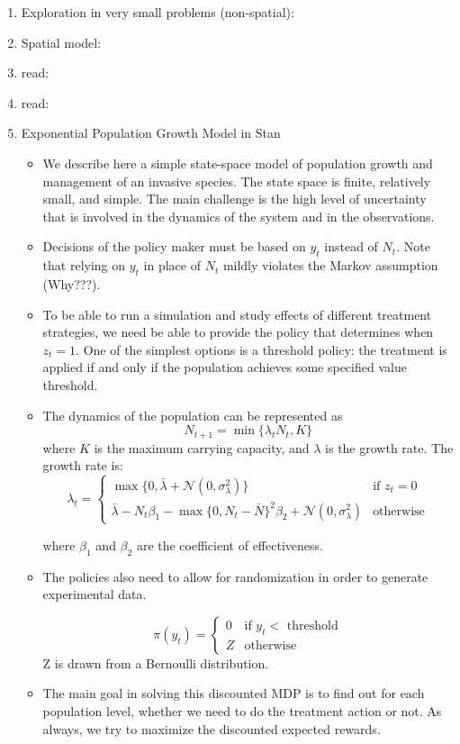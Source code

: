 \documentclass{article}
\theoremstyle{remark}
\theoremstyle{remark}
\theoremstyle{remark}
\theoremstyle{remark}
\theoremstyle{remark}
\theoremstyle{remark}
\newcommand{\marek}[1]{\textcolor{Bittersweet}{#1}}
\begin{document}
\begin{enumerate}
\begin{itemize}
	\end{itemize}
	\item Exploration in very small problems (non-spatial): \cite{Hall2018,Taleghan2015}
	\item Spatial model: \cite{Nicol2017}
	\item \marek{read}: \cite{Albers2018}
	\item \marek{read}: \cite{Mehta2007}
	\item Exponential Population Growth Model in Stan
	\begin{itemize}
		\item We describe here a simple state-space model of population growth and management of an invasive species. The state space is finite, relatively small, and simple. The main challenge is the high level of uncertainty that is involved in the dynamics of the system and in the observations.
		\item Decisions of the policy maker must be based on $y_t$ instead of $N_t$. Note that relying on $y_t$ in place of $N_t$ mildly violates the Markov assumption (Why???).
		\item To be able to run a simulation and study effects of different treatment strategies, we need be able to provide the policy that determines when $z_t=1$. One of the simplest options is a threshold policy: the treatment is applied if and only if the population achieves some specified value threshold.
		\item The dynamics of the population can be represented as
		$$ N_{t+1} = \min \{\lambda_t N_t, K \} $$
		where $K$ is the maximum carrying capacity, and $\lambda$ is the growth rate. The growth rate is:
		\begin{equation}
		\lambda_t = \begin{cases}
				\max \{ 0, \bar{\lambda} + \mathcal{N}(0, \sigma_\lambda^2) \} & \text{if $z_t = 0 $} \\
				\bar{\lambda} - N_t \beta_1 - \max \{ 0, N_t - \bar{N}\}^2\beta_2 + \mathcal{N}(0, \sigma_\lambda^2) & \text{otherwise}
			\end{cases}
		\end{equation}

		where $\beta_1$ and $\beta_2$ are the coefficient of effectiveness.
		\item The policies also need to allow for randomization in order to generate experimental data.

		\begin{equation}
		  \pi(y_t)=\begin{cases}
		    0 & \text{if $y_t <$  threshold}\\
		    Z & \text{otherwise}
		  \end{cases}
		\end{equation}
		Z is drawn from a Bernoulli distribution.
		\item The main goal in solving this discounted MDP is to find out for each population level, whether we need to do the treatment action or not. As always, we try to maximize the discounted expected rewards.

	\end{itemize}
\end{enumerate}
\end{document}
